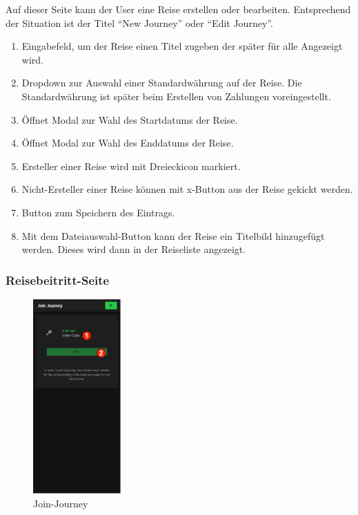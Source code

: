 Auf dieser Seite kann der User eine Reise erstellen oder bearbeiten. Entsprechend der Situation ist der Titel  "`New Journey"' oder "`Edit Journey"'.

\begin{enumerate}[label=\protect\circled{\arabic*}]
	\item Eingabefeld, um der Reise einen Titel zugeben der später für alle Angezeigt wird.
	\item Dropdown zur Auswahl einer Standardwährung auf der Reise.
	      Die Standardwährung ist später beim Erstellen von Zahlungen voreingestellt.
	\item Öffnet Modal zur Wahl des Startdatums der Reise.
	\item Öffnet Modal zur Wahl des Enddatums der Reise.
	\item Ersteller einer Reise wird mit Dreieckicon markiert.
	\item Nicht-Ersteller einer Reise können mit x-Button aus der Reise gekickt werden.
	\item Button zum Speichern des Eintrags.
	\item Mit dem Dateiauswahl-Button kann der Reise ein Titelbild hinzugefügt werden. Dieses wird dann in der Reiseliste angezeigt.
\end{enumerate}

\subsubsection{Reisebeitritt-Seite}\label{Reisebeitretenseite}
\begin{figure}[H]
	\centering
	\includegraphics[width=0.3\textwidth]{img/pages_numbers/join-journey.drawio}
	\caption[Join-Journey]{Join-Journey}
	\label{fig:Join-Journey}
\end{figure}


